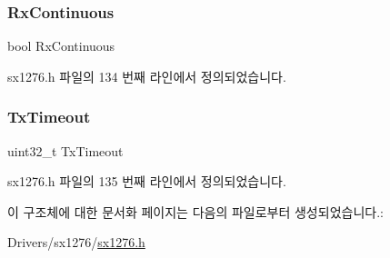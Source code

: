 \subsubsection{\texorpdfstring{Rx\+Continuous}{RxContinuous}}
{\footnotesize\ttfamily bool Rx\+Continuous}



sx1276.\+h 파일의 134 번째 라인에서 정의되었습니다.

\mbox{\label{struct_radio_lo_ra_settings__t_a51e578bc6e36b50abdbf3c91be46bc5b}} 
\subsubsection{\texorpdfstring{Tx\+Timeout}{TxTimeout}}
{\footnotesize\ttfamily uint32\+\_\+t Tx\+Timeout}



sx1276.\+h 파일의 135 번째 라인에서 정의되었습니다.



이 구조체에 대한 문서화 페이지는 다음의 파일로부터 생성되었습니다.\+:\begin{DoxyCompactItemize}
\item 
Drivers/sx1276/\mbox{\hyperlink{sx1276_8h}{sx1276.\+h}}\end{DoxyCompactItemize}

